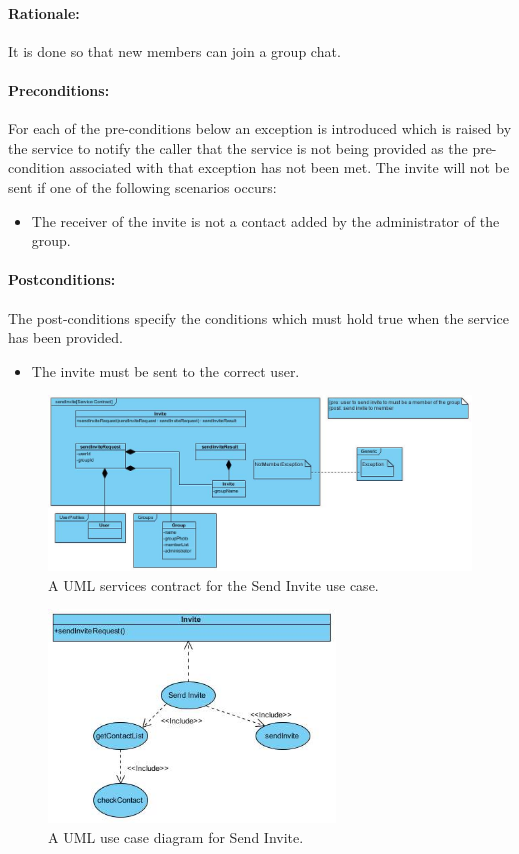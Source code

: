 \documentclass[11pt]{article}
\begin{document}
\paragraph{Rationale:} It is done so that new members can join a group chat.
\paragraph{Preconditions:}
 For each of the pre-conditions below an exception is introduced which is raised by the service to notify the caller that the service is not being provided as the pre-condition associated with that exception has not been met.\newline
 The invite will not be sent if one of the following scenarios occurs:
 \begin{itemize}
 \item	The receiver of the invite is not a contact added by the administrator of the group.
 \end{itemize}
\paragraph{Postconditions:}
The post-conditions specify the conditions which must hold true when the service has been provided.
 \begin{itemize}
\item	The invite must be sent to the correct user.
\end{itemize}
\begin{figure}[H]
\centering
\includegraphics[width=5in]{./images/serviceContract-sendInvite.jpg}
\caption[Send Invite Services Contract]{A UML services contract for the Send Invite use case.}
\label{SC-figure-send-invite}
\end{figure}
\begin{figure}[H]
\centering
\includegraphics[width=3in]{./images/FR-sendInvite.jpg}
\caption[Send Invite Use Case Diagram]{A UML use case diagram for Send Invite.}
\end{figure}
\end{document}

